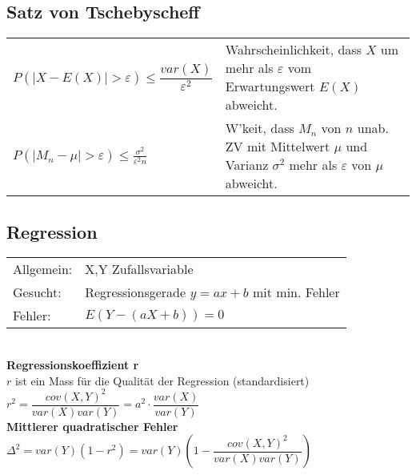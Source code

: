 \subsection{Satz von Tschebyscheff }
\begin{tabular}{ll}
  $P(\left| X-E(X) \right|>\varepsilon)\leq\dfrac{var(X)}{\varepsilon^2}$ &
  Wahrscheinlichkeit, dass $X$ um mehr als $\varepsilon$ vom Erwartungswert $E(X)$ abweicht.\\
  $P(|M_{n}-\mu|>\varepsilon)\leq \frac{\sigma^{2}}{\varepsilon^{2}n} $ &
  W'keit, dass $M_{n}$ von $n$ unab. ZV mit Mittelwert $\mu$ und Varianz $\sigma^{2}$ mehr als $\varepsilon$ von $\mu$ abweicht.
\end{tabular}


\begin{minipage}[t]{9cm}
  \subsection{Regression }
  \begin{tabular}{ll}
    Allgemein: & X,Y Zufallsvariable \\
    Gesucht: & Regressionsgerade $y=ax+b$ mit min. Fehler \\
    Fehler: & $E(Y-(aX+b))=0$ \\
  \end{tabular} \\
 
  \textbf{Regressionskoeffizient r} \\
  $r$ ist ein Mass für die Qualität der Regression (standardisiert) \\
  $r^2=\dfrac{cov(X,Y)^2}{var(X)var(Y)}=a^2\cdot\dfrac{var(X)}{var(Y)}$ \\
 
  \textbf{Mittlerer quadratischer Fehler} \\
  $\Delta^2 = var(Y)(1-r^2) =
  var(Y)\left(1-\dfrac{cov(X,Y)^2}{var(X)var(Y)}\right) $ \\
\end{minipage}
